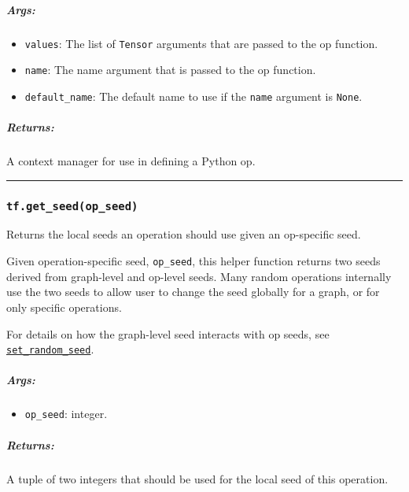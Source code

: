 \subparagraph{Args: }\label{args-43}

\begin{itemize}
\tightlist
\item
  \lstinline{values}: The list of \lstinline{Tensor} arguments that are passed
  to the op function.
\item
  \lstinline{name}: The name argument that is passed to the op function.
\item
  \lstinline{default_name}: The default name to use if the \lstinline{name}
  argument is \lstinline{None}.
\end{itemize}

\subparagraph{Returns: }\label{returns-39}

A context manager for use in defining a Python op.

\begin{center}\rule{0.5\linewidth}{\linethickness}\end{center}

\subsubsection{\texorpdfstring{\lstinline{tf.get_seed(op_seed)}
}{tf.get_seed(op_seed) }}\label{tf.getux5fseedopux5fseed}

Returns the local seeds an operation should use given an op-specific
seed.

Given operation-specific seed, \lstinline{op_seed}, this helper function
returns two seeds derived from graph-level and op-level seeds. Many
random operations internally use the two seeds to allow user to change
the seed globally for a graph, or for only specific operations.

For details on how the graph-level seed interacts with op seeds, see
\href{../../api_docs/python/constant_op.md\#set_random_seed}{\lstinline{set_random_seed}}.

\subparagraph{Args: }\label{args-44}

\begin{itemize}
\tightlist
\item
  \lstinline{op_seed}: integer.
\end{itemize}

\subparagraph{Returns: }\label{returns-40}

A tuple of two integers that should be used for the local seed of this
operation.

